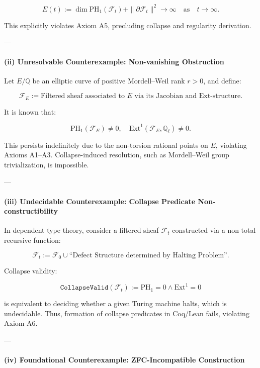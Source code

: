 \documentclass[11pt]{article}
\begin{document}
\[
E(t) := \dim \mathrm{PH}_1(\mathcal{F}_t) + \|\partial \mathcal{F}_t\|^2 \longrightarrow \infty \quad \text{as} \quad t \to \infty.
\]

This explicitly violates Axiom A5, precluding collapse and regularity derivation.

---

\paragraph{(ii) Unresolvable Counterexample: Non-vanishing Obstruction}

Let $E/\mathbb{Q}$ be an elliptic curve of positive Mordell–Weil rank $r>0$, and define:

\[
\mathcal{F}_E := \text{Filtered sheaf associated to } E \text{ via its Jacobian and Ext-structure}.
\]

It is known that:

\[
\mathrm{PH}_1(\mathcal{F}_E) \neq 0, \quad \mathrm{Ext}^1(\mathcal{F}_E, \mathbb{Q}_\ell) \neq 0.
\]

This persists indefinitely due to the non-torsion rational points on $E$, violating Axioms A1–A3.  
Collapse-induced resolution, such as Mordell–Weil group trivialization, is impossible.

---

\paragraph{(iii) Undecidable Counterexample: Collapse Predicate Non-constructibility}

In dependent type theory, consider a filtered sheaf $\mathcal{F}_t$ constructed via a non-total recursive function:

\[
\mathcal{F}_t := \mathcal{F}_0 \cup \text{``Defect Structure determined by Halting Problem''}.
\]

Collapse validity:

\[
\texttt{CollapseValid}(\mathcal{F}_t) := \mathrm{PH}_1 = 0 \wedge \mathrm{Ext}^1 = 0
\]

is equivalent to deciding whether a given Turing machine halts, which is undecidable.  
Thus, formation of collapse predicates in Coq/Lean fails, violating Axiom A6.

---

\paragraph{(iv) Foundational Counterexample: ZFC-Incompatible Construction}
\end{document}
